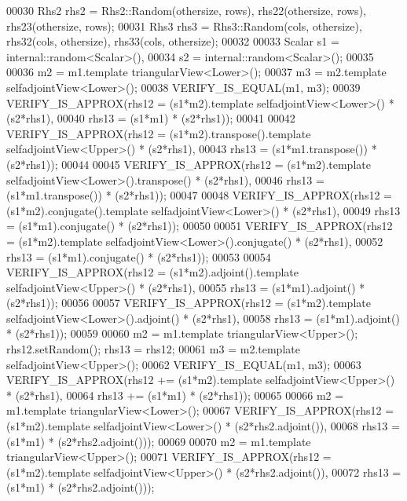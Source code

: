 \begin{DoxyCode}
00030   Rhs2 rhs2 = Rhs2::Random(othersize, rows), rhs22(othersize, rows), rhs23(othersize, rows);
00031   Rhs3 rhs3 = Rhs3::Random(cols, othersize), rhs32(cols, othersize), rhs33(cols, othersize);
00032 
00033   Scalar s1 = internal::random<Scalar>(),
00034          s2 = internal::random<Scalar>();
00035 
00036   m2 = m1.template triangularView<Lower>();
00037   m3 = m2.template selfadjointView<Lower>();
00038   VERIFY\_IS\_EQUAL(m1, m3);
00039   VERIFY\_IS\_APPROX(rhs12 = (s1*m2).\textcolor{keyword}{template} selfadjointView<Lower>() * (s2*rhs1),
00040                    rhs13 = (s1*m1) * (s2*rhs1));
00041 
00042   VERIFY\_IS\_APPROX(rhs12 = (s1*m2).transpose().\textcolor{keyword}{template} selfadjointView<Upper>() * (s2*rhs1),
00043                    rhs13 = (s1*m1.transpose()) * (s2*rhs1));
00044 
00045   VERIFY\_IS\_APPROX(rhs12 = (s1*m2).\textcolor{keyword}{template} selfadjointView<Lower>().transpose() * (s2*rhs1),
00046                    rhs13 = (s1*m1.transpose()) * (s2*rhs1));
00047 
00048   VERIFY\_IS\_APPROX(rhs12 = (s1*m2).conjugate().\textcolor{keyword}{template} selfadjointView<Lower>() * (s2*rhs1),
00049                    rhs13 = (s1*m1).conjugate() * (s2*rhs1));
00050 
00051   VERIFY\_IS\_APPROX(rhs12 = (s1*m2).\textcolor{keyword}{template} selfadjointView<Lower>().conjugate() * (s2*rhs1),
00052                    rhs13 = (s1*m1).conjugate() * (s2*rhs1));
00053 
00054   VERIFY\_IS\_APPROX(rhs12 = (s1*m2).adjoint().\textcolor{keyword}{template} selfadjointView<Upper>() * (s2*rhs1),
00055                    rhs13 = (s1*m1).adjoint() * (s2*rhs1));
00056 
00057   VERIFY\_IS\_APPROX(rhs12 = (s1*m2).\textcolor{keyword}{template} selfadjointView<Lower>().adjoint() * (s2*rhs1),
00058                    rhs13 = (s1*m1).adjoint() * (s2*rhs1));
00059 
00060   m2 = m1.template triangularView<Upper>(); rhs12.setRandom(); rhs13 = rhs12;
00061   m3 = m2.template selfadjointView<Upper>();
00062   VERIFY\_IS\_EQUAL(m1, m3);
00063   VERIFY\_IS\_APPROX(rhs12 += (s1*m2).\textcolor{keyword}{template} selfadjointView<Upper>() * (s2*rhs1),
00064                    rhs13 += (s1*m1) * (s2*rhs1));
00065 
00066   m2 = m1.template triangularView<Lower>();
00067   VERIFY\_IS\_APPROX(rhs12 = (s1*m2).\textcolor{keyword}{template} selfadjointView<Lower>() * (s2*rhs2.adjoint()),
00068                    rhs13 = (s1*m1) * (s2*rhs2.adjoint()));
00069 
00070   m2 = m1.template triangularView<Upper>();
00071   VERIFY\_IS\_APPROX(rhs12 = (s1*m2).\textcolor{keyword}{template} selfadjointView<Upper>() * (s2*rhs2.adjoint()),
00072                    rhs13 = (s1*m1) * (s2*rhs2.adjoint()));

\end{DoxyCode}
